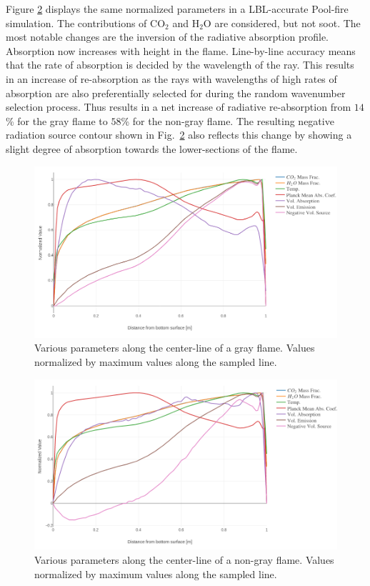 Figure \ref{fig:PoolFire_lineplot_nongray} displays the same normalized parameters in a LBL-accurate Pool-fire simulation. The contributions of CO$_2$ and H$_2$O are considered, but not soot.
The most notable changes are the inversion of the radiative absorption profile. Absorption now increases with height in the flame. Line-by-line accuracy means that the rate of absorption is decided by the wavelength of the ray.
This results in an increase of re-absorption as the rays with wavelengths of high rates of absorption are also preferentially selected for during the random wavenumber selection process. Thus results in a net increase of radiative re-absorption from $14$\% for the gray flame to $58$\% for the non-gray flame.
The resulting negative radiation source contour shown in Fig.~\ref{fig:PoolFire_lineplot_nongray} also reflects this change by showing a slight degree of absorption towards the lower-sections of the flame.

\begin{figure}[!ht]
\includegraphics[width=\linewidth]{figures/ch4/line_plot.png}
\caption{Various parameters along the center-line of a gray flame. Values normalized by maximum values along the sampled line.}
\label{fig:PoolFire_lineplot}
\end{figure}


\begin{figure}[!ht]
\includegraphics[width=\linewidth]{figures/ch4/line_plot_nongray.png}
\caption{Various parameters along the center-line of a non-gray flame. Values normalized by maximum values along the sampled line.}
\label{fig:PoolFire_lineplot_nongray}
\end{figure}

